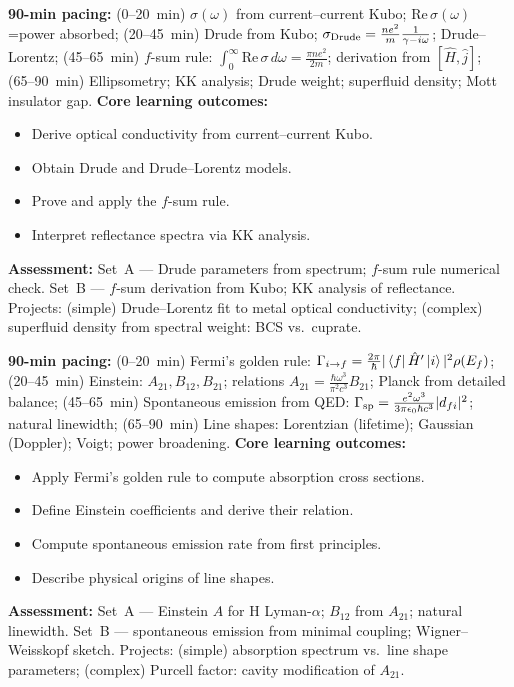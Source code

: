 \documentclass[11pt,a4paper]{article}
\begin{document}
\medskip

\begin{tcolorbox}[modulebox, title={Module~II.6 / L05: Optical Conductivity and the $f$-Sum Rule}]
\textbf{90-min pacing:} (0--20~min) $\sigma(\omega)$ from current--current Kubo; Re$\,\sigma(\omega)$=power absorbed; (20--45~min) Drude from Kubo; $\sigma_{\rm Drude}=\tfrac{ne^2}{m}\tfrac{1}{\gamma-i\omega}$; Drude--Lorentz; (45--65~min) $f$-sum rule: $\int_0^\infty\text{Re}\,\sigma\,d\omega=\tfrac{\pi ne^2}{2m}$; derivation from $[\hat{H},\hat{j}]$; (65--90~min) Ellipsometry; KK analysis; Drude weight; superfluid density; Mott insulator gap.
\medskip\textbf{Core learning outcomes:}
\begin{itemize}[leftmargin=1.4em,topsep=2pt,itemsep=1pt]
  \item Derive optical conductivity from current--current Kubo.
  \item Obtain Drude and Drude--Lorentz models.
  \item Prove and apply the $f$-sum rule.
  \item Interpret reflectance spectra via KK analysis.
\end{itemize}
\medskip\textbf{Assessment:}
Set~A --- Drude parameters from spectrum; $f$-sum rule numerical check.
Set~B --- $f$-sum derivation from Kubo; KK analysis of reflectance.
Projects: (simple) Drude--Lorentz fit to metal optical conductivity; (complex) superfluid density from spectral weight: BCS vs.\ cuprate.
\end{tcolorbox}

\medskip

\begin{tcolorbox}[modulebox, title={Module~II.6 / L06: Absorption, Emission, and Einstein Coefficients}]
\textbf{90-min pacing:} (0--20~min) Fermi's golden rule: $\Gamma_{i\to f}=\tfrac{2\pi}{\hbar}|\bra{f}\hat{H}'\ket{i}|^2\rho(E_f)$; (20--45~min) Einstein: $A_{21},B_{12},B_{21}$; relations $A_{21}=\tfrac{\hbar\omega^3}{\pi^2c^3}B_{21}$; Planck from detailed balance; (45--65~min) Spontaneous emission from QED: $\Gamma_{\rm sp}=\tfrac{e^2\omega^3}{3\pi\epsilon_0\hbar c^3}|d_{fi}|^2$; natural linewidth; (65--90~min) Line shapes: Lorentzian (lifetime); Gaussian (Doppler); Voigt; power broadening.
\medskip\textbf{Core learning outcomes:}
\begin{itemize}[leftmargin=1.4em,topsep=2pt,itemsep=1pt]
  \item Apply Fermi's golden rule to compute absorption cross sections.
  \item Define Einstein coefficients and derive their relation.
  \item Compute spontaneous emission rate from first principles.
  \item Describe physical origins of line shapes.
\end{itemize}
\medskip\textbf{Assessment:}
Set~A --- Einstein $A$ for H Lyman-$\alpha$; $B_{12}$ from $A_{21}$; natural linewidth.
Set~B --- spontaneous emission from minimal coupling; Wigner--Weisskopf sketch.
Projects: (simple) absorption spectrum vs.\ line shape parameters; (complex) Purcell factor: cavity modification of $A_{21}$.
\end{tcolorbox}
\end{document}
